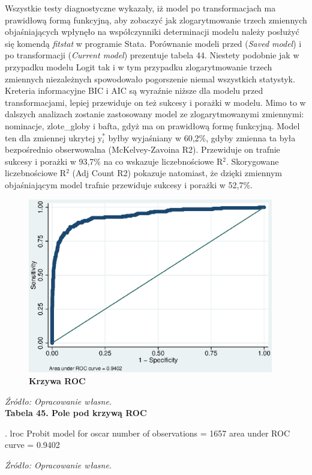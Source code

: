 Wszystkie testy diagnostyczne wykazały, iż model po transformacjach ma prawidłową formą funkcyjną, aby zobaczyć jak zlogarytmowanie trzech zmiennych objaśniających wpłynęło na współczynniki determinacji modelu należy posłużyć się komendą \textit{fitstat} w programie Stata. Porównanie modeli przed (\textit{Saved model}) i po transformacji (\textit{Current model}) prezentuje tabela 44. Niestety podobnie jak w przypadku modelu Logit tak i w tym przypadku zlogarytmowanie trzech zmiennych niezależnych spowodowało pogorszenie niemal wszystkich statystyk. Kreteria informacyjne BIC i AIC są wyraźnie niższe dla modelu   przed transformacjami, lepiej przewiduje on też sukcesy i porażki w modelu. Mimo to w dalszych analizach zostanie zastosowany model ze zlogarytmowanymi zmiennymi: nominacje, zlote_globy i bafta, gdyż ma on prawidłową formę funkcyjną. Model ten dla zmiennej ukrytej y$_{i}^{*}$ byłby wyjaśniany w 60,2\%, gdyby zmienna ta była bezpośrednio obserwowalna (McKelvey-Zavoina R2). Przewiduje on trafnie sukcesy i porażki w 93,7\% na co wskazuje liczebnościowe R$^{2}$. Skorygowane liczebnościowe R$^{2}$ (Adj Count R2) pokazuje natomiast, że dzięki zmiennym objaśniającym model trafnie przewiduje sukcesy i porażki w 52,7\%.

\begin{figure}[h]
\begin{centering}
  \includegraphics[height=3in]{Rysunki//PROC}
    \caption{\textbf{Krzywa ROC}}
\end{centering}
\end{figure}
\textit{\footnotesize{Źródło: Opracowanie własne.}} \\

\vspace{0.5cm}
\textbf{Tabela 45. Pole pod krzywą ROC }
\begin{stlog}
. lroc 
{\smallskip}
Probit model for oscar
{\smallskip}
number of observations =     1657
area under ROC curve   =   0.9402
 \end{stlog}
\textit{\footnotesize{Źródło: Opracowanie własne.}} \\

